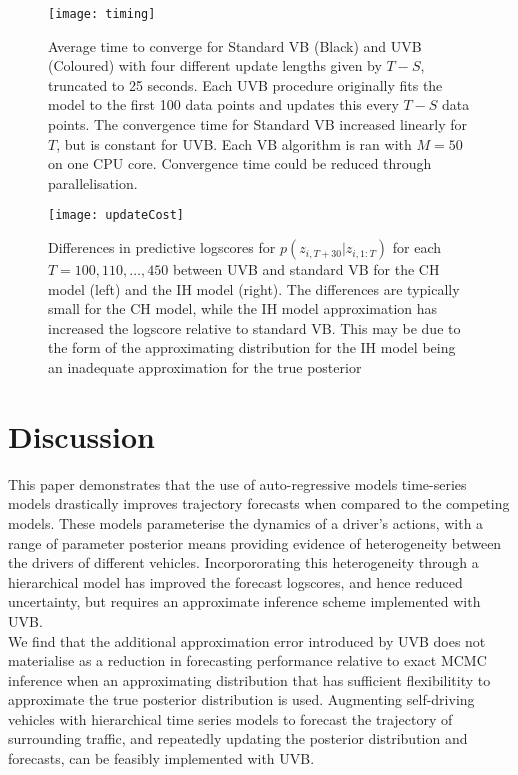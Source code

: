 \documentclass[12pt,a4paper]{article}\usepackage[]{graphicx}\usepackage[]{color}
\begin{document}
\begin{figure}[htp]
\centering
\texttt{[image: timing]}
\caption{Average time to converge for Standard VB (Black) and UVB (Coloured) with four different update lengths given by $T - S$, truncated to 25 seconds. Each UVB procedure originally fits the model to the first 100 data points and updates this every $T - S$ data points. The convergence time for Standard VB increased linearly for $T$, but is constant for UVB. Each VB algorithm is ran with $M = 50$ on one CPU core. Convergence time could be reduced through parallelisation.}
\label{fig:timing}
\end{figure}
\begin{figure}[htp]
\centering
\texttt{[image: updateCost]}
\caption{Differences in predictive logscores for $p(z_{i, T+30} | z_{i, 1:T})$ for each $T = 100, 110, \dots, 450$ between UVB and standard VB for the CH model (left) and the IH model (right). The differences are typically small for the CH model, while the IH model approximation has increased the logscore relative to standard VB. This may be due to the form of the approximating distribution for the IH model being an inadequate approximation for the true posterior}
\label{fig:updateCost}
\end{figure}


\newpage


\section{Discussion}
\label{sec:disc}
This paper demonstrates that the use of auto-regressive models time-series models drastically improves trajectory forecasts when compared to the competing models.  These models parameterise the dynamics of a driver's actions, with a range of parameter posterior means providing evidence of heterogeneity between the drivers of different vehicles. Incorpororating this heterogeneity through a hierarchical model has improved the forecast logscores, and hence reduced uncertainty, but requires an approximate inference scheme implemented with UVB. 
\\

We find that the additional approximation error introduced by UVB does not materialise as a reduction in forecasting performance relative to exact MCMC inference when an approximating distribution that has sufficient flexibilitity to approximate the true posterior distribution is used. Augmenting self-driving vehicles with hierarchical time series models to forecast the trajectory of surrounding traffic, and repeatedly updating the posterior distribution and forecasts, can be feasibly implemented with UVB.
\\
\end{document}
